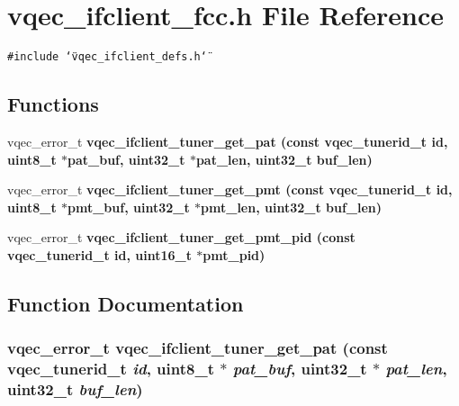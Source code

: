 \section{vqec\_\-ifclient\_\-fcc.h File Reference}
\label{vqec__ifclient__fcc_8h}
{\tt \#include \char`\"{}vqec\_\-ifclient\_\-defs.h\char`\"{}}\par
\subsection*{Functions}
\begin{CompactItemize}
\item 
vqec\_\-error\_\-t \bf{vqec\_\-ifclient\_\-tuner\_\-get\_\-pat} (const vqec\_\-tunerid\_\-t id, uint8\_\-t $\ast$pat\_\-buf, uint32\_\-t $\ast$pat\_\-len, uint32\_\-t buf\_\-len)
\item 
vqec\_\-error\_\-t \bf{vqec\_\-ifclient\_\-tuner\_\-get\_\-pmt} (const vqec\_\-tunerid\_\-t id, uint8\_\-t $\ast$pmt\_\-buf, uint32\_\-t $\ast$pmt\_\-len, uint32\_\-t buf\_\-len)
\item 
vqec\_\-error\_\-t \bf{vqec\_\-ifclient\_\-tuner\_\-get\_\-pmt\_\-pid} (const vqec\_\-tunerid\_\-t id, uint16\_\-t $\ast$pmt\_\-pid)
\end{CompactItemize}


\subsection{Function Documentation}
\subsubsection{\setlength{\rightskip}{0pt plus 5cm}vqec\_\-error\_\-t vqec\_\-ifclient\_\-tuner\_\-get\_\-pat (const vqec\_\-tunerid\_\-t {\em id}, uint8\_\-t $\ast$ {\em pat\_\-buf}, uint32\_\-t $\ast$ {\em pat\_\-len}, uint32\_\-t {\em buf\_\-len})}\label{vqec__ifclient__fcc_8h_7a2b67bf04444f603429b972cfaf9bd4}


